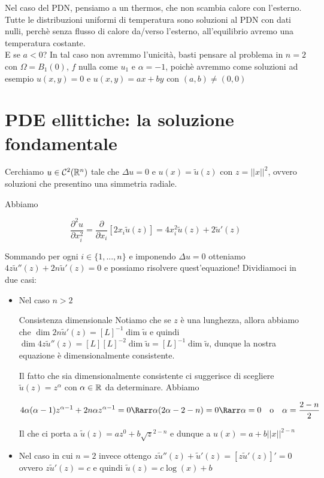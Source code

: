 \documentclass{article}
\begin{document}
\begin{remark}{}{}
    Nel caso del PDN, pensiamo a un thermos, che non scambia calore con l'esterno. Tutte le distribuzioni uniformi di temperatura sono soluzioni al PDN con dati nulli, perchè senza flusso di calore da/verso l'esterno, all'equilibrio avremo una temperatura costante.\\
    E se $a<0$? In tal caso non avremmo l'unicità, basti pensare al problema in $n=2$ con $\Omega = B_1(0)$, $f$ nulla come $u_1$ e $\alpha = -1$, poichè avremmo come soluzioni ad esempio $u(x,y)=0$ e $u(x,y) = ax+by$ con $(a,b)\neq(0,0)$
\end{remark}

\section{PDE ellittiche: la soluzione fondamentale}

Cerchiamo $u \in \mathcal{C}^2(\mathbb{R}^n)$ tale che $\Delta u = 0$ e $u(x) = \tilde{u}(z)$ con $z = ||x||^2$, ovvero soluzioni che presentino una simmetria radiale.

Abbiamo

\[\frac{\partial^2 u}{\partial x_i^2} = \frac{\partial}{\partial x_i} [2x_i\tilde{u}(z)] = 4x_i^2 \tilde{u}(z) + 2\tilde{u}'(z)\]

Sommando per ogni $i \in \{1,...,n\}$ e imponendo $\Delta u = 0$ otteniamo $4z\tilde{u}''(z) + 2n\tilde{u}'(z) = 0$ e possiamo risolvere quest'equazione! Dividiamoci in due casi:\begin{itemize}
\item Nel caso $n>2$
\begin{remark}{Consistenza dimensionale}{}
    Notiamo che se $z$ è una lunghezza, allora abbiamo che $\dim 2n\tilde{u}'(z) = [L]^{-1}\dim \tilde{u}$ e quindi $\dim 4z \tilde{u}''(z) = [L][L]^{-2}\dim\tilde{u} = [L]^{-1}\dim \tilde{u}$, dunque la nostra equazione è dimensionalmente consistente.
\end{remark}

Il fatto che sia dimensionalmente consistente ci suggerisce di scegliere $\tilde{u}(z) = z^\alpha$ con $\alpha \in \mathbb{R}$ da determinare. Abbiamo

\[4\alpha(\alpha-1)z^{\alpha-1} + 2n\alpha z^{\alpha - 1} = 0 \Rarr \alpha(2\alpha - 2 - n) = 0 \Rarr \alpha = 0 \quad \text{o}\quad \alpha = \frac{2-n}{2}\]

Il che ci porta a $\tilde{u}(z) = az^0 + b\sqrt{z}^{2-n}$ e dunque a $u(x) = a + b||x||^{2-n}$

\item Nel caso in cui $n=2$ invece ottengo $z\tilde{u}''(z) + \tilde{u}'(z) = [z\tilde{u}'(z)]'=0$ ovvero $z\tilde{u}'(z) = c$ e quindi $\tilde{u}(z) = c\log(x) + b$
\end{itemize}
\end{document}
